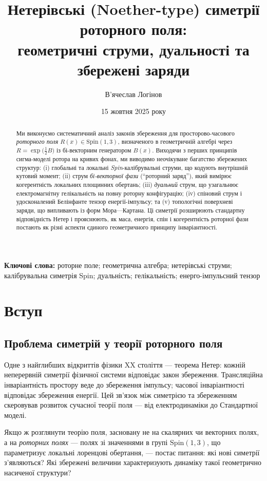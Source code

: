 \documentclass[11pt,a4paper]{article}
\title{Нетерівські (Noether-type) симетрії роторного поля:\\
геометричні струми, дуальності та збережені заряди}
\author[1]{В'ячеслав Логінов}
\affil[1]{Київ, Україна\\ \texttt{barthez.slavik@gmail.com}}
\date{15 жовтня 2025 року}
\numberwithin{equation}{section}
\theoremstyle{plain}
\theoremstyle{definition}
\theoremstyle{remark}
\newcommand{\keywords}{\textbf{Ключові слова:} роторне поле; геометрична алгебра; нетерівські струми; калібрувальна симетрія Spin; дуальність; гелікальність; енерго-імпульсний тензор}
\begin{document}
\maketitle

\begin{abstract}
Ми виконуємо систематичний аналіз законів збереження для просторово-часового \emph{роторного поля} $R(x)\in \mathrm{Spin}(1,3)$, визначеного в геометричній алгебрі через $R=\exp\!\big(\tfrac{1}{2}B\big)$ із бі-векторним генератором $B(x)$. Виходячи з перших принципів сигма-моделі ротора на кривих фонах, ми виводимо неочікуване багатство збережених структур: (i) глобальні та локальні \emph{Spin}-калібрувальні струми, що кодують внутрішній кутовий момент; (ii) струм \emph{бі-векторної фази} (``роторний заряд''), який вимірює когерентність локальних площинних обертань; (iii) \emph{дуальний} струм, що узагальнює електромагнітну гелікальність на повну роторну конфігурацію; (iv) спіновий струм і удосконалений Белінфанте тензор енергії-імпульсу; та (v) топологічні поверхневі заряди, що випливають із форм Мора—Картана. Ці симетрії розширюють стандартну відповідність Нетер і прояснюють, як маса, енергія, спін і когерентність роторної фази постають як різні аспекти єдиного геометричного принципу інваріантності.
\end{abstract}

\keywords

\section{Вступ}
\label{sec:intro}

\subsection{Проблема симетрій у теорії роторного поля}

Одне з найглибших відкриттів фізики XX століття — теорема Нетер: кожній неперервній симетрії фізичної системи відповідає закон збереження. Трансляційна інваріантність простору веде до збереження імпульсу; часової інваріантності відповідає збереження енергії. Цей зв’язок між симетрією та збереженням скеровував розвиток сучасної теорії поля — від електродинаміки до Стандартної моделі.

Якщо ж розглянути теорію поля, засновану не на скалярних чи векторних полях, а на \emph{роторних полях} — полях зі значеннями в групі $\mathrm{Spin}(1,3)$, що параметризує локальні лоренцові обертання, — постає питання: які нові симетрії з’являються? Які збережені величини характеризують динаміку такої геометрично насиченої структури?
\end{document}

